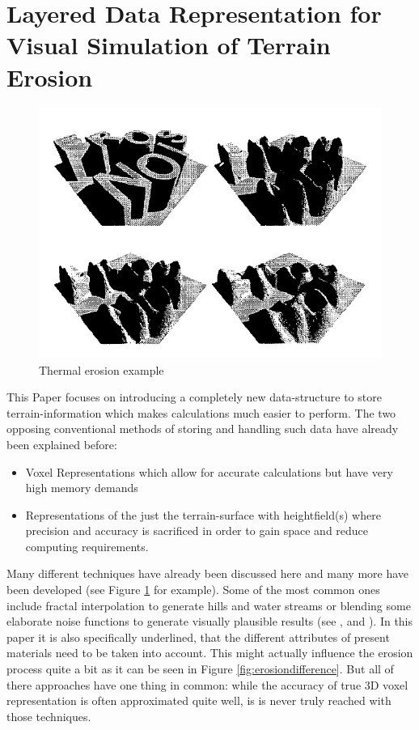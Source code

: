 \section{Layered Data Representation for Visual Simulation of Terrain Erosion}


\begin{figure}[htb]
	\centering
	\includegraphics[width=\linewidth]{MGG_10/snap2.png}
	\caption{Thermal erosion example}
	\label{fig:thermal_erosion}
\end{figure}

This Paper \cite{marechal2010heat} focuses on introducing a completely new data-structure to store terrain-information which makes calculations much easier to perform. The two opposing conventional methods of storing and handling such data have already been explained before:
\begin{itemize}
	\item Voxel Representations which allow for accurate calculations but have very high memory demands
	\item Representations of the just the terrain-surface with heightfield(s) where precision and accuracy is sacrificed in order to gain space and reduce computing requirements.
\end{itemize}

Many different techniques have already been discussed here and many more have been developed (see Figure \ref{fig:thermal_erosion} for example). Some of the most common ones include fractal interpolation to generate hills and water streams \cite{kelley1988terrain} or blending some elaborate noise functions to generate visually plausible results (see \cite{eckbert2000simulating}, \cite{musgrave1989synthesis} and \cite{musgrave1999towards}). In this paper it is also specifically underlined, that the different attributes of present materials need to be taken into account. This might actually influence the erosion process quite a bit as it can be seen in Figure \ref{fig:erosiondifference}. But all of there approaches have one thing in common: while the accuracy of true 3D voxel representation is often approximated quite well, is is never truly reached with those techniques.

